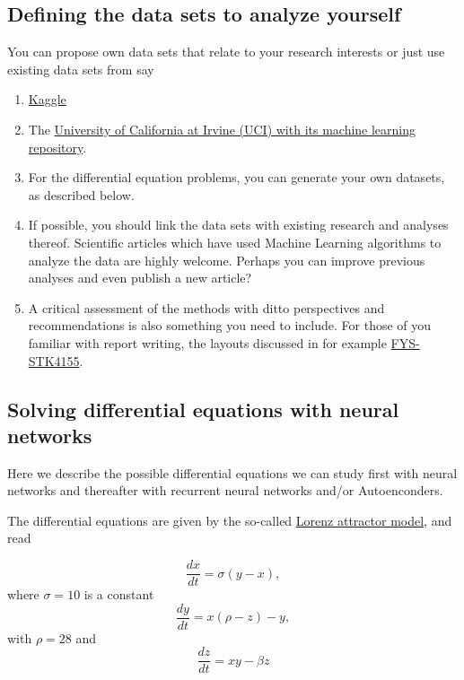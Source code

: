 \documentclass[%
oneside,                 %
final,                   %
10pt]{article}
\begin{document}
\noindent
\subsection{Defining the data sets to analyze yourself}

You can propose own data sets that relate to your research interests or just use existing data sets from say
\begin{enumerate}
\item \href{{https://www.kaggle.com/datasets}}{Kaggle} 

\item The \href{{https://archive.ics.uci.edu/ml/index.php}}{University of California at Irvine (UCI) with its  machine learning repository}.

\item For the differential equation problems, you can generate your own datasets, as described below.

\item If possible, you should link the data sets with existing research and analyses thereof. Scientific articles which have used Machine Learning algorithms to analyze the data are highly welcome. Perhaps you can improve previous analyses and even publish a new article? 

\item A critical assessment of the methods with ditto perspectives and recommendations is also something you need to include. For those of you familiar with report writing, the layouts discussed in for example \href{{https://github.com/CompPhysics/MachineLearning/blob/master/doc/Projects/EvaluationGrading/EvaluationForm.md}}{FYS-STK4155}.
\end{enumerate}

\noindent
\subsection{Solving  differential equations with neural networks}

Here we describe the possible differential equations we can study
first with neural networks and thereafter with recurrent neural
networks and/or Autoenconders.

The differential equations are given by the so-called \href{{https://encyclopediaofmath.org/index.php?title=Lorenz_attractor}}{Lorenz attractor model}, and read

\[
\frac{dx}{dt}=\sigma\left(y-x\right),
\]
where $\sigma =10$ is a constant
\[
\frac{dy}{dt}= x\left(\rho-z\right)-y,
\]
with $\rho=28$ and
\[
\frac{dz}{dt}=xy-\beta z
\]
\end{document}
